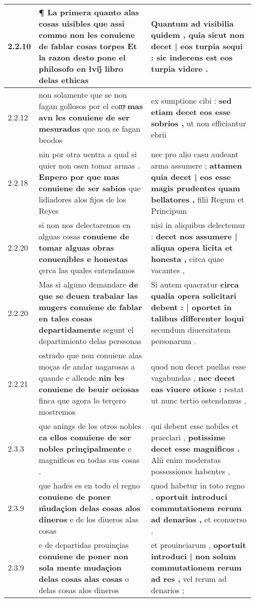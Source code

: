 \begin{tabular}{|p{1cm}|p{6.5cm}|p{6.5cm}|}
2.2.10 & ¶ La primera quanto alas cosas uisibles \textbf{ que assi commo non les conuiene de fablar cosas torpes } Et la razon desto pone el philosofo en łvij̊ libro delas ethicas & Quantum ad visibilia quidem , \textbf{ quia sicut non decet | eos turpia sequi : } sic indecens est eos turpia videre . \\\hline
2.2.12 & non solamente que se non fagan gollosos por el comͣ \textbf{ mas avn les conuiene de ser mesurados } que non se fagan beodos & ex sumptione cibi : \textbf{ sed etiam decet eos esse sobrios , } ut non efficiantur ebrii \\\hline
2.2.18 & nin por otra uentra a qual si quier non osen tomar armas . \textbf{ Enpero por que mas conuiene de ser sabios } que lidiadores alos fijos de los Reyes & nec pro alio casu audeant arma assumere ; \textbf{ attamen quia decet | eos esse magis prudentes quam bellatores , } filii Regum et Principum \\\hline
2.2.20 & si non nos delectaremos en alguas cosas \textbf{ conuiene de tomar alguas obras conuenibles e honestas } çerca las quales entendamos & nisi in aliquibus delectemur : \textbf{ decet nos assumere | aliqua opera licita et honesta , } circa quae vacantes , \\\hline
2.2.20 & Mas si alguno demandare \textbf{ de que se deuen trabaiar las mugers conuiene de fablar en tales cosas departidamente } segunt el departimiento delas perssonas & Si autem quaeratur \textbf{ circa qualia opera solicitari debent : | oportet in talibus differenter loqui } secundum diuersitatem personarum . \\\hline
2.2.21 & ostrado que non conuiene alas moças de andar uagarosas a quande e allende \textbf{ nin les conuiene de beuir ociosas } finca que agora lo terçero mostremos & quod non decet puellas esse vagabundas , \textbf{ nec decet eas viuere otiose : } restat ut nunc tertio ostendamus , \\\hline
2.3.3 & que anings de los otros nobles \textbf{ ca ellos conuiene de ser nobles prinçipalmente } e magnificos en todas sus cosas . & qui debent esse nobiles et praeclari , \textbf{ potissime decet esse magnificos . } Alii enim moderatas possessiones habentes , \\\hline
2.3.9 & que hades es en todo el regno \textbf{ conuiene de poner m̃udaçion delas cosas alos dineros } e de los diueros alas cosas & quod habetur in toto regno , \textbf{ oportuit introduci commutationem rerum ad denarios , } et econuerso . \\\hline
2.3.9 & e de departidas prouinçias \textbf{ conuiene de poner non sola mente mudaçion delas cosas alas cosas } o delas cosas alos dineros & et prouinciarum , \textbf{ oportuit introduci | non solum commutationem rerum ad res , } vel rerum ad denarios ; \\\hline

\end{tabular}
